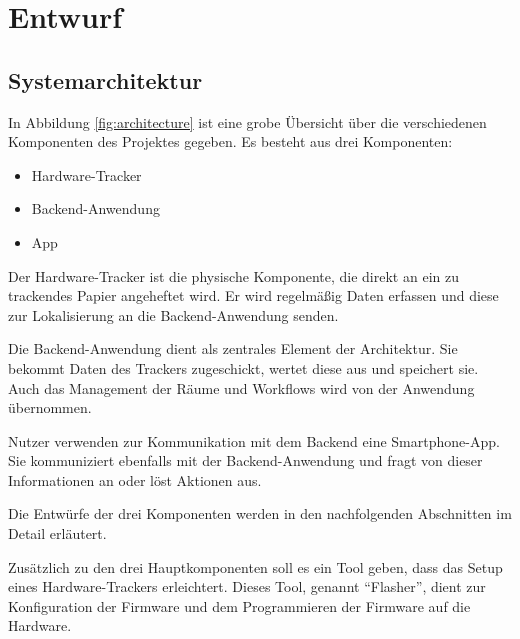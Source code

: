\chapter{Entwurf} \label{chap:entwurf}

\section{Systemarchitektur} \label{sec:systemarchitektur}

In Abbildung \ref{fig:architecture} ist eine grobe Übersicht über die verschiedenen Komponenten des Projektes gegeben.
Es besteht aus drei Komponenten:
\begin{itemize}
	\item Hardware-Tracker
	\item Backend-Anwendung
	\item App
\end{itemize}

Der Hardware-Tracker ist die physische Komponente, die direkt an ein zu trackendes Papier angeheftet wird.
Er wird regelmäßig Daten erfassen und diese zur Lokalisierung an die Backend-Anwendung senden.

Die Backend-Anwendung dient als zentrales Element der Architektur.
Sie bekommt Daten des Trackers zugeschickt, wertet diese aus und speichert sie.
Auch das Management der Räume und Workflows wird von der Anwendung übernommen.

Nutzer verwenden zur Kommunikation mit dem Backend eine Smartphone-App.
Sie kommuniziert ebenfalls mit der Backend-Anwendung und fragt von dieser Informationen an oder löst Aktionen aus.

Die Entwürfe der drei Komponenten werden in den nachfolgenden Abschnitten im Detail erläutert.

Zusätzlich zu den drei Hauptkomponenten soll es ein Tool geben, dass das Setup eines Hardware-Trackers erleichtert.
Dieses Tool, genannt \enquote{Flasher}, dient zur Konfiguration der Firmware und dem Programmieren der Firmware auf die Hardware.

